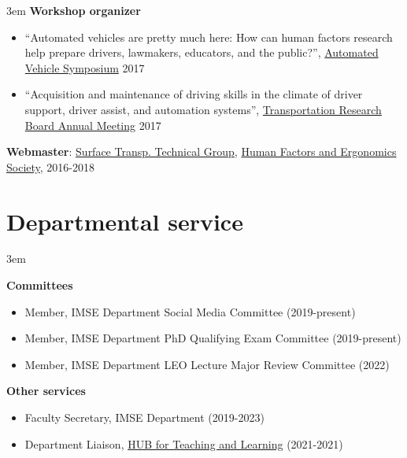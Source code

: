 \documentclass[11pt]{article}
\newenvironment{main}
{\begin{adjustwidth}{3em}{}}
{\end{adjustwidth}}
\begin{document}
\begin{main}
\textbf{Workshop organizer}
\begin{itemize}
    \item ``Automated vehicles are pretty much here: How can human factors research help prepare drivers, lawmakers, educators, and the public?'', \href{www.automatedvehiclessymposium.org}{Automated Vehicle Symposium} 2017
    \item ``Acquisition and maintenance of driving skills in the climate of driver support, driver assist, and automation systems'', \href{http://www.trb.org/AnnualMeeting/}{Transportation Research Board Annual Meeting} 2017
\end{itemize}

\textbf{Webmaster}: \href{http://hfessttg.blogspot.com/}{Surface Transp. Technical Group}, \href{https://www.hfes.org/}{Human Factors and Ergonomics Society}, 2016-2018



\end{main}
\section*{Departmental service}
\begin{main}

\textbf{Committees}

\begin{itemize}
    \item Member, IMSE Department Social Media Committee (2019-present)
    \item Member, IMSE Department PhD Qualifying Exam Committee (2019-present)
    \item Member, IMSE Department LEO Lecture Major Review Committee (2022)
\end{itemize}

\textbf{Other services}
\begin{itemize}
    \item Faculty Secretary, IMSE Department (2019-2023)
    \item Department Liaison, \href{https://umdearborn.edu/faculty-staff/hub-teaching-learning-resources}{HUB for Teaching and Learning} (2021-2021)
\end{itemize}

\end{main}
\end{document}
